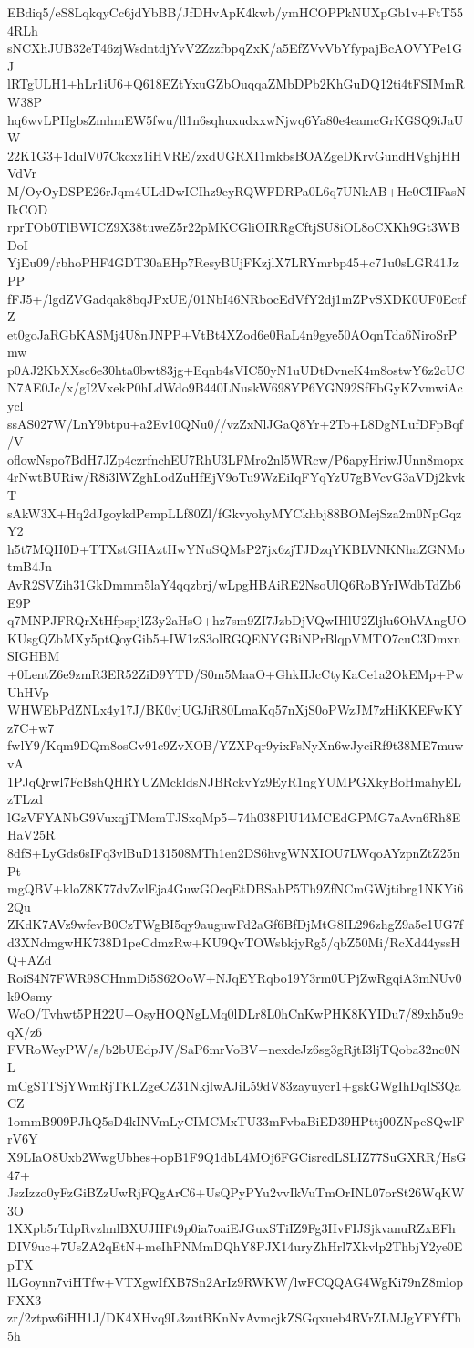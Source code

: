 EBdiq5/eS8LqkqyCc6jdYbBB/JfDHvApK4kwb/ymHCOPPkNUXpGb1v+FtT554RLh
sNCXhJUB32eT46zjWsdntdjYvV2ZzzfbpqZxK/a5EfZVvVbYfypajBcAOVYPe1GJ
lRTgULH1+hLr1iU6+Q618EZtYxuGZbOuqqaZMbDPb2KhGuDQ12ti4tFSIMmRW38P
hq6wvLPHgbsZmhmEW5fwu/ll1n6sqhuxudxxwNjwq6Ya80e4eamcGrKGSQ9iJaUW
22K1G3+1dulV07Ckcxz1iHVRE/zxdUGRXI1mkbsBOAZgeDKrvGundHVghjHHVdVr
M/OyOyDSPE26rJqm4ULdDwICIhz9eyRQWFDRPa0L6q7UNkAB+Hc0CIIFasNIkCOD
rprTOb0TlBWICZ9X38tuweZ5r22pMKCGliOIRRgCftjSU8iOL8oCXKh9Gt3WBDoI
YjEu09/rbhoPHF4GDT30aEHp7ResyBUjFKzjlX7LRYmrbp45+c71u0sLGR41JzPP
fFJ5+/lgdZVGadqak8bqJPxUE/01NbI46NRbocEdVfY2dj1mZPvSXDK0UF0EctfZ
et0goJaRGbKASMj4U8nJNPP+VtBt4XZod6e0RaL4n9gye50AOqnTda6NiroSrPmw
p0AJ2KbXXsc6e30hta0bwt83jg+Eqnb4sVIC50yN1uUDtDvneK4m8ostwY6z2cUC
N7AE0Jc/x/gI2VxekP0hLdWdo9B440LNuskW698YP6YGN92SfFbGyKZvmwiAcycl
ssAS027W/LnY9btpu+a2Ev10QNu0//vzZxNlJGaQ8Yr+2To+L8DgNLufDFpBqf/V
oflowNspo7BdH7JZp4czrfnchEU7RhU3LFMro2nl5WRcw/P6apyHriwJUnn8mopx
4rNwtBURiw/R8i3lWZghLodZuHfEjV9oTu9WzEiIqFYqYzU7gBVcvG3aVDj2kvkT
sAkW3X+Hq2dJgoykdPempLLf80Zl/fGkvyohyMYCkhbj88BOMejSza2m0NpGqzY2
h5t7MQH0D+TTXstGIIAztHwYNuSQMsP27jx6zjTJDzqYKBLVNKNhaZGNMotmB4Jn
AvR2SVZih31GkDmmm5laY4qqzbrj/wLpgHBAiRE2NsoUlQ6RoBYrIWdbTdZb6E9P
q7MNPJFRQrXtHfpspjlZ3y2aHsO+hz7sm9ZI7JzbDjVQwIHlU2Zljlu6OhVAngUO
KUsgQZbMXy5ptQoyGib5+IW1zS3olRGQENYGBiNPrBlqpVMTO7cuC3DmxnSIGHBM
+0LentZ6e9zmR3ER52ZiD9YTD/S0m5MaaO+GhkHJcCtyKaCe1a2OkEMp+PwUhHVp
WHWEbPdZNLx4y17J/BK0vjUGJiR80LmaKq57nXjS0oPWzJM7zHiKKEFwKYz7C+w7
fwlY9/Kqm9DQm8osGv91c9ZvXOB/YZXPqr9yixFsNyXn6wJyciRf9t38ME7muwvA
1PJqQrwl7FcBshQHRYUZMckldsNJBRckvYz9EyR1ngYUMPGXkyBoHmahyELzTLzd
lGzVFYANbG9VuxqjTMcmTJSxqMp5+74h038PlU14MCEdGPMG7aAvn6Rh8EHaV25R
8dfS+LyGds6sIFq3vlBuD131508MTh1en2DS6hvgWNXIOU7LWqoAYzpnZtZ25nPt
mgQBV+kloZ8K77dvZvlEja4GuwGOeqEtDBSabP5Th9ZfNCmGWjtibrg1NKYi62Qu
ZKdK7AVz9wfevB0CzTWgBI5qy9auguwFd2aGf6BfDjMtG8IL296zhgZ9a5e1UG7f
d3XNdmgwHK738D1peCdmzRw+KU9QvTOWsbkjyRg5/qbZ50Mi/RcXd44yssHQ+AZd
RoiS4N7FWR9SCHnmDi5S62OoW+NJqEYRqbo19Y3rm0UPjZwRgqiA3mNUv0k9Osmy
WcO/Tvhwt5PH22U+OsyHOQNgLMq0lDLr8L0hCnKwPHK8KYIDu7/89xh5u9cqX/z6
FVRoWeyPW/s/b2bUEdpJV/SaP6mrVoBV+nexdeJz6sg3gRjtI3ljTQoba32nc0NL
mCgS1TSjYWmRjTKLZgeCZ31NkjlwAJiL59dV83zayuycr1+gskGWgIhDqIS3QaCZ
1ommB909PJhQ5sD4kINVmLyCIMCMxTU33mFvbaBiED39HPttj00ZNpeSQwlFrV6Y
X9LIaO8Uxb2WwgUbhes+opB1F9Q1dbL4MOj6FGCisrcdLSLIZ77SuGXRR/HsG47+
JszIzzo0yFzGiBZzUwRjFQgArC6+UsQPyPYu2vvIkVuTmOrINL07orSt26WqKW3O
1XXpb5rTdpRvzlmlBXUJHFt9p0ia7oaiEJGuxSTiIZ9Fg3HvFIJSjkvanuRZxEFh
DIV9uc+7UsZA2qEtN+meIhPNMmDQhY8PJX14uryZhHrl7Xkvlp2ThbjY2ye0EpTX
lLGoynn7viHTfw+VTXgwIfXB7Sn2ArIz9RWKW/lwFCQQAG4WgKi79nZ8mlopFXX3
zr/2ztpw6iHH1J/DK4XHvq9L3zutBKnNvAvmcjkZSGqxueb4RVrZLMJgYFYfTh5h
